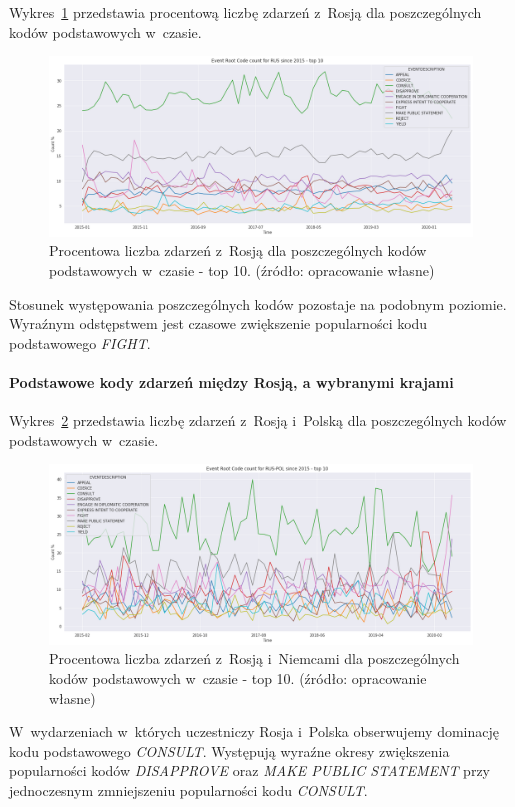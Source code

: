 \documentclass[11pt]{report}
\begin{document}
    Wykres~\ref{fig:RUSPERCpercinTIME} przedstawia procentową liczbę zdarzeń z~Rosją dla poszczególnych kodów podstawowych w~czasie.
    \begin{figure}[!htp]
        \centering
        \includegraphics[width=\linewidth]{fig/RUS/RUSERCpercinTIME.png}
        \caption{Procentowa liczba zdarzeń z~Rosją dla poszczególnych kodów podstawowych w~czasie - top 10. (źródło: opracowanie własne)}
        \label{fig:RUSPERCpercinTIME}
    \end{figure}
    Stosunek występowania poszczególnych kodów pozostaje na podobnym poziomie.
    Wyraźnym odstępstwem jest czasowe zwiększenie popularności kodu podstawowego \textit{FIGHT}.

    \paragraph{Podstawowe kody zdarzeń między Rosją, a wybranymi krajami}

    Wykres~\ref{fig:RUSPOLERC} przedstawia liczbę zdarzeń z~Rosją i~Polską dla poszczególnych kodów podstawowych w~czasie.
    \begin{figure}[!htp]
        \centering
        \includegraphics[width=\linewidth]{fig/RUS/RUSPOLERCperc.png}
        \caption{Procentowa liczba zdarzeń z~Rosją i~Niemcami dla poszczególnych kodów podstawowych w~czasie - top 10. (źródło: opracowanie własne)}
        \label{fig:RUSPOLERC}
    \end{figure}
    W~wydarzeniach w~których uczestniczy Rosja i~Polska obserwujemy dominację kodu podstawowego \textit{CONSULT}.
    Występują wyraźne okresy zwiększenia popularności kodów \textit{DISAPPROVE} oraz \textit{MAKE PUBLIC STATEMENT} przy jednoczesnym zmniejszeniu popularności kodu \textit{CONSULT}.
\end{document}
